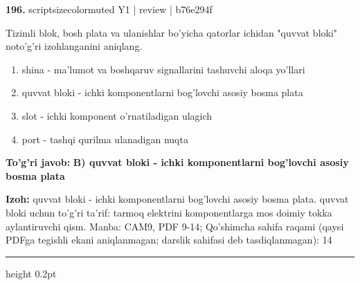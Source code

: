 \documentclass[10pt,a4paper]{article}
\begin{document}
{\bfseries\sffamily\color{ink} 196.} {scriptsizecolor{muted} Y1 | review | b76e294f}
\par
Tizimli blok, bosh plata va ulanishlar bo'yicha qatorlar ichidan "quvvat bloki" noto'g'ri izohlanganini aniqlang.
\begin{enumerate}[label=\Alph*),leftmargin=9mm]
\item shina - ma'lumot va boshqaruv signallarini tashuvchi aloqa yo'llari
\item quvvat bloki - ichki komponentlarni bog'lovchi asosiy bosma plata
\item slot - ichki komponent o'rnatiladigan ulagich
\item port - tashqi qurilma ulanadigan nuqta
\end{enumerate}
\begin{tcolorbox}[enhanced,breakable,colback=teal!4,colframe=teal!60!black,boxrule=0.45pt,arc=1.2mm,left=2.7mm,right=2.7mm,top=1.8mm,bottom=1.8mm,before skip=2mm,after skip=2mm]
{\bfseries\sffamily\color{teal}To'g'ri javob:} \textbf{B) quvvat bloki - ichki komponentlarni bog'lovchi asosiy bosma plata}
\par\smallskip
{\bfseries Izoh:} quvvat bloki - ichki komponentlarni bog'lovchi asosiy bosma plata. quvvat bloki uchun to'g'ri ta'rif: tarmoq elektrini komponentlarga mos doimiy tokka aylantiruvchi qism. Manba: CAM9, PDF 9-14; Qo'shimcha sahifa raqami (qaysi PDFga tegishli ekani aniqlanmagan; darslik sahifasi deb tasdiqlanmagan): 14
\end{tcolorbox}
\vspace{2mm}\hrule height 0.2pt\vspace{3mm}
\end{document}

